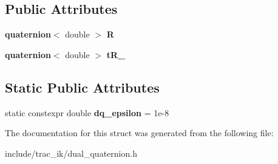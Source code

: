 \subsection*{Public Attributes}
\begin{DoxyCompactItemize}
\item 
{\bf quaternion}$<$ double $>$ {\bfseries R}\label{structdual__quaternion_ad1d98ac3a9cdf7f4185195b164de6660}

\item 
{\bf quaternion}$<$ double $>$ {\bfseries t\-R\-\_}\label{structdual__quaternion_a2a67ab7931cf6f02759e530198686ca9}

\end{DoxyCompactItemize}
\subsection*{Static Public Attributes}
\begin{DoxyCompactItemize}
\item 
static constexpr double {\bfseries dq\-\_\-epsilon} = 1e-\/8\label{structdual__quaternion_ae41ad8c90f3663ca2d119e6c42060a3d}

\end{DoxyCompactItemize}


The documentation for this struct was generated from the following file\-:\begin{DoxyCompactItemize}
\item 
include/trac\-\_\-ik/dual\-\_\-quaternion.\-h\end{DoxyCompactItemize}
